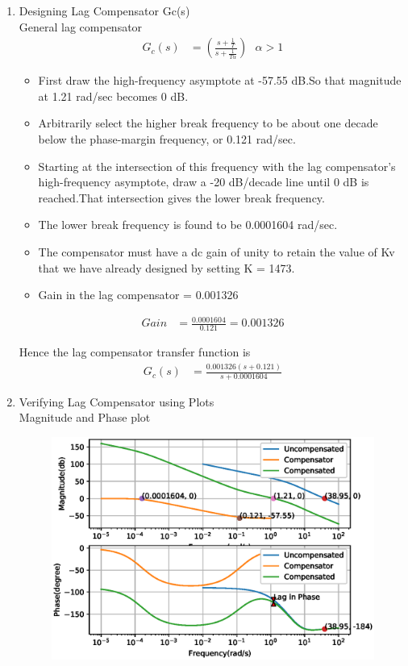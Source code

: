 \begin{enumerate}[label=\thesubsection.\arabic*.,ref=\thesubsection.\theenumi]
\item Designing Lag Compensator Gc(s)
\\
\solution 
General lag compensator 
\begin{align}
G_{c}(s) &= \left(\frac{s+\frac{1}{T}}{s+\frac{1}{T\alpha}}\right)  \text{  } \alpha > 1
\end{align}
\begin{itemize}
\item First draw the high-frequency asymptote at -57.55 dB.So that magnitude at 1.21 rad/sec becomes 0 dB.
\item Arbitrarily select the higher break frequency to be about one decade below the phase-margin frequency, or 0.121 rad/sec.
\item Starting at the intersection of this frequency with the lag compensator’s high-frequency asymptote, draw a
-20 dB/decade line until 0 dB is reached.That intersection gives the lower break frequency.
\item The lower break frequency is found to be 0.0001604 rad/sec. 
\item The compensator must have a dc gain of unity to retain the value of Kv that we have already designed by setting K = 1473. 

\item Gain in the lag compensator = 0.001326

\end{itemize}
\begin{align}
 Gain &= \frac{0.0001604}{0.121} = 0.001326 
\end{align}

Hence the lag compensator transfer function is
\begin{align}
 G_{c}(s) &= \frac{0.001326(s+0.121)}{s+0.0001604} 
\end{align}
\item Verifying Lag Compensator using Plots
\\
\solution Magnitude and Phase plot


\begin{figure}[!ht]
\centering
  \includegraphics[width=\columnwidth]{./figs/ee18btech11030/ee18btech11030_2.eps}
\caption{} 
\label{fig:ee18btech11030_2}
\end{figure}



\end{enumerate}
